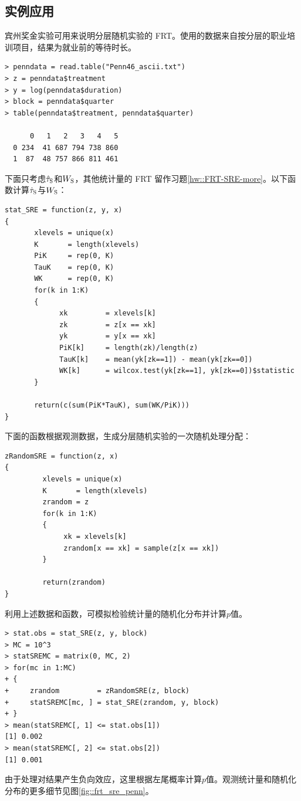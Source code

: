  
 
 \subsection{实例应用}
 \label{sec::frt-pennbonus}
 
 
 
宾州奖金实验可用来说明分层随机实验的 FRT。\citet{koenker2002inference}使用的数据来自按分层的职业培训项目，结果为就业前的等待时长。 

\begin{lstlisting}
> penndata = read.table("Penn46_ascii.txt")
> z = penndata$treatment
> y = log(penndata$duration)
> block = penndata$quarter
> table(penndata$treatment, penndata$quarter)
   
      0   1   2   3   4   5
  0 234  41 687 794 738 860
  1  87  48 757 866 811 461
\end{lstlisting} 


下面只考虑$\hat{\tau}_\textsc{S}$和$W_\textsc{S}$，其他统计量的 FRT 留作习题\ref{hw::FRT-SRE-more}。以下函数计算$\hat{\tau}_\textsc{S}$与$W_\textsc{S}$：

\begin{lstlisting}
stat_SRE = function(z, y, x)
{
       xlevels = unique(x)
       K       = length(xlevels)
       PiK     = rep(0, K)
       TauK    = rep(0, K)
       WK      = rep(0, K)
       for(k in 1:K)
       {
             xk         = xlevels[k]
             zk         = z[x == xk]
             yk         = y[x == xk]
             PiK[k]     = length(zk)/length(z)
             TauK[k]    = mean(yk[zk==1]) - mean(yk[zk==0])
             WK[k]      = wilcox.test(yk[zk==1], yk[zk==0])$statistic
       }
       
       return(c(sum(PiK*TauK), sum(WK/PiK)))
}
\end{lstlisting} 


下面的函数根据观测数据，生成分层随机实验的一次随机处理分配：

\begin{lstlisting}
zRandomSRE = function(z, x)
{
         xlevels = unique(x)
         K       = length(xlevels)
         zrandom = z
         for(k in 1:K)
         {
              xk = xlevels[k]   
              zrandom[x == xk] = sample(z[x == xk])
         }
         
         return(zrandom)
}
\end{lstlisting} 


利用上述数据和函数，可模拟检验统计量的随机化分布并计算$p$值。 
\begin{lstlisting}
> stat.obs = stat_SRE(z, y, block)
> MC = 10^3
> statSREMC = matrix(0, MC, 2)
> for(mc in 1:MC)
+ {
+     zrandom         = zRandomSRE(z, block) 
+     statSREMC[mc, ] = stat_SRE(zrandom, y, block)     
+ }
> mean(statSREMC[, 1] <= stat.obs[1])
[1] 0.002
> mean(statSREMC[, 2] <= stat.obs[2])
[1] 0.001
\end{lstlisting} 
由于处理对结果产生负向效应，这里根据左尾概率计算$p$值。观测统计量和随机化分布的更多细节见图\ref{fig::frt_sre_penn}。  
 

